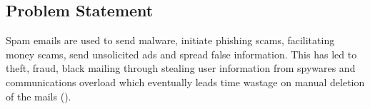 \subsection{Problem Statement}
Spam emails are used to send malware, initiate phishing scams, facilitating money scams, send unsolicited ads and spread false information. This has led to theft, fraud, black mailing through stealing user information from spywares and communications overload which eventually leads time wastage on manual deletion of the mails (\cite{kaspersky}).